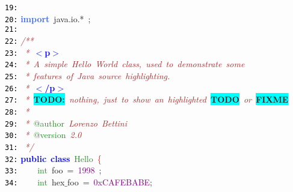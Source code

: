 \documentclass{article}
\begin{document}
\mbox{}\texttt{\textcolor{Black}{19:}}  \\
\mbox{}\texttt{\textcolor{Black}{20:}} \textbf{\textcolor{RoyalBlue}{import}}\ java\textcolor{BrickRed}{.}io\textcolor{BrickRed}{.*}\ \textcolor{BrickRed}{;} \\
\mbox{}\texttt{\textcolor{Black}{21:}}  \\
\mbox{}\texttt{\textcolor{Black}{22:}} \textit{\textcolor{Brown}{/**}} \\
\mbox{}\texttt{\textcolor{Black}{23:}} \textit{\textcolor{Brown}{\ *\ }}\textbf{\textcolor{Blue}{$<$p$>$}} \\
\mbox{}\texttt{\textcolor{Black}{24:}} \textit{\textcolor{Brown}{\ *\ A\ simple\ Hello\ World\ class,\ used\ to\ demonstrate\ some}} \\
\mbox{}\texttt{\textcolor{Black}{25:}} \textit{\textcolor{Brown}{\ *\ features\ of\ Java\ source\ highlighting.}} \\
\mbox{}\texttt{\textcolor{Black}{26:}} \textit{\textcolor{Brown}{\ *\ }}\textbf{\textcolor{Blue}{$<$/p$>$}} \\
\mbox{}\texttt{\textcolor{Black}{27:}} \textit{\textcolor{Brown}{\ *\ }}\textbf{\colorbox{Cyan}{TODO:}}\textit{\textcolor{Brown}{\ nothing,\ just\ to\ show\ an\ highlighted\ }}\textbf{\colorbox{Cyan}{TODO}}\textit{\textcolor{Brown}{\ or\ }}\textbf{\colorbox{Cyan}{FIXME}} \\
\mbox{}\texttt{\textcolor{Black}{28:}} \textit{\textcolor{Brown}{\ *}} \\
\mbox{}\texttt{\textcolor{Black}{29:}} \textit{\textcolor{Brown}{\ *\ }}\textcolor{ForestGreen}{@author}\textit{\textcolor{Brown}{\ Lorenzo\ Bettini}} \\
\mbox{}\texttt{\textcolor{Black}{30:}} \textit{\textcolor{Brown}{\ *\ }}\textcolor{ForestGreen}{@version}\textit{\textcolor{Brown}{\ 2.0}} \\
\mbox{}\texttt{\textcolor{Black}{31:}} \textit{\textcolor{Brown}{\ */}} \\
\mbox{}\texttt{\textcolor{Black}{32:}} \textbf{\textcolor{Blue}{public}}\ \textbf{\textcolor{Blue}{class}}\ \textcolor{ForestGreen}{Hello}\ \textcolor{Red}{\{} \\
\mbox{}\texttt{\textcolor{Black}{33:}} \ \ \ \ \textcolor{ForestGreen}{int}\ foo\ \textcolor{BrickRed}{=}\ \textcolor{Purple}{1998}\ \textcolor{BrickRed}{;} \\
\mbox{}\texttt{\textcolor{Black}{34:}} \ \ \ \ \textcolor{ForestGreen}{int}\ hex$\_$foo\ \textcolor{BrickRed}{=}\ \textcolor{Purple}{0xCAFEBABE}\textcolor{BrickRed}{;} \\
\end{document}
